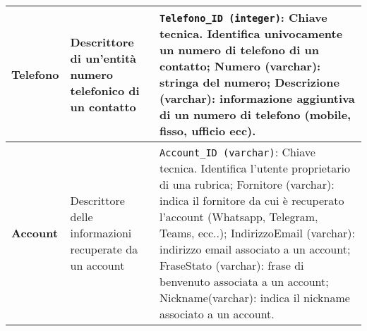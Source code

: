 \begin{longtable}{p{}p{}p{}}
\textbf{Telefono} &
Descrittore di un'entità numero telefonico di un contatto &
\verb|Telefono_ID (integer)|: Chiave tecnica. Identifica univocamente un numero di telefono di un contatto; \newline
Numero (varchar): stringa del numero;\newline
Descrizione (varchar): informazione aggiuntiva di un numero di telefono (mobile, fisso, ufficio ecc).
\\ \midrule
\textbf{Account} &
Descrittore delle informazioni recuperate da un account &
\verb|Account_ID (varchar)|: Chiave tecnica. Identifica l’utente proprietario di una rubrica;\newline
Fornitore (varchar): indica il fornitore da cui è recuperato l'account (Whatsapp, Telegram, Teams, ecc..);\newline
IndirizzoEmail (varchar): indirizzo email associato a un account;\newline
FraseStato (varchar): frase di benvenuto associata a un account;\newline
Nickname(varchar): indica il nickname associato a un account.
\\ \bottomrule
\end{longtable}
\clearpage

